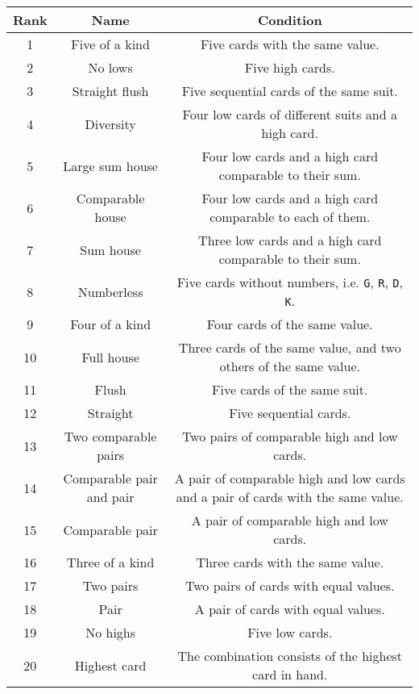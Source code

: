 \begin{tabular}{|c|c|c|} \hline
    Rank & Name & Condition \\ \hline
    1 & Five of a kind & Five cards with the same value. \\ \hline
    2 & No lows & Five high cards. \\ \hline
    3 & Straight flush & Five sequential cards of the same suit. \\ \hline
    4 & Diversity & Four low cards of different suits and a high card. \\ \hline
    5 & Large sum house & Four low cards and a high card comparable to their sum. \\ \hline 
    6 & Comparable house & Four low cards and a high card comparable to each of them. \\ \hline 
    7 & Sum house & Three low cards and a high card comparable to their sum. \\ \hline 
    8 & Numberless & Five cards without numbers, i.e. \texttt{G}, \texttt{R}, \texttt{D}, \texttt{K}. \\ \hline 
    9 & Four of a kind & Four cards of the same value. \\ \hline
    10 & Full house & Three cards of the same value, and two others of the same value. \\ \hline 
    11 & Flush & Five cards of the same suit. \\ \hline
    12 & Straight & Five sequential cards. \\ \hline
    13 & Two comparable pairs & Two pairs of comparable high and low cards. \\ \hline
    14 & Comparable pair and pair & A pair of comparable high and low cards and a pair of cards with the same value. \\ \hline
    15 & Comparable pair & A pair of comparable high and low cards. \\ \hline
    16 & Three of a kind & Three cards with the same value. \\ \hline
    17 & Two pairs & Two pairs of cards with equal values. \\ \hline
    18 & Pair & A pair of cards with equal values. \\ \hline
    19 & No highs & Five low cards. \\ \hline
    20 & Highest card & The combination consists of the highest card in hand. \\ \hline
\end{tabular}

